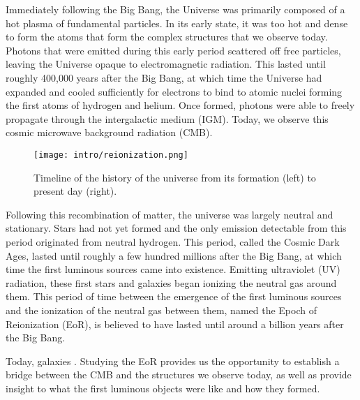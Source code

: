 Immediately following the Big Bang, the Universe was primarily composed of a hot plasma of fundamental particles. In its early state, it was  too hot and dense to form the atoms that form the complex structures that we observe today. Photons that were emitted during this early period scattered off free particles, leaving the Universe opaque to electromagnetic radiation. This lasted until roughly 400,000 years after the Big Bang, at which time the Universe had expanded and cooled sufficiently for electrons to bind to atomic nuclei forming the first atoms of hydrogen and helium. Once formed, photons were able to freely propagate through the intergalactic medium (IGM). Today, we observe this cosmic microwave background radiation (CMB).

\begin{figure}[th]
	\centering
	\texttt{[image: intro/reionization.png]}
	\caption[Epoch of Reionization Timeline]{Timeline of the history of the universe from its formation (left) to present day (right).}
	\label{fig:timeline}
\end{figure}

Following this recombination of matter, the universe was largely neutral and stationary.
Stars had not yet formed and the only emission detectable from this period originated
from neutral hydrogen. This period, called the Cosmic Dark Ages, lasted until roughly a few hundred millions after the Big Bang,
at which time the first luminous sources came into existence. Emitting ultraviolet (UV)
radiation, these first stars and galaxies began ionizing the neutral gas around them.
This period of time between the emergence of the first luminous sources and the
ionization of the neutral gas between them, named the Epoch of Reionization (EoR),
is believed to have lasted until around a billion years after the Big Bang.

Today, galaxies . Studying the EoR provides us the opportunity to establish a
bridge between the CMB and the structures we observe today, as well as provide
insight to what the first luminous objects were like and how they formed.
